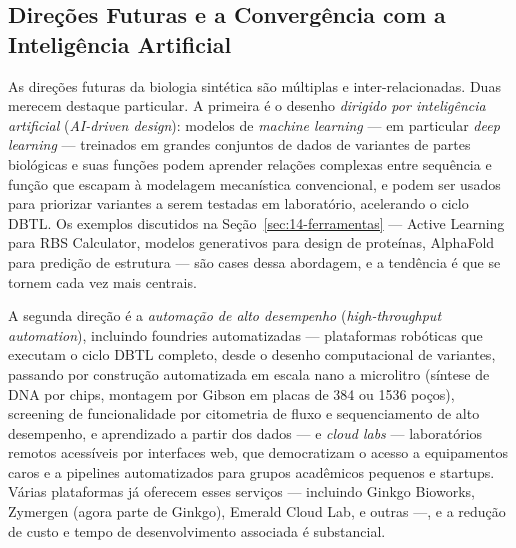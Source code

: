 
\subsection{Direções Futuras e a Convergência com a Inteligência Artificial}

As direções futuras da biologia sintética são múltiplas e inter-relacionadas. Duas merecem destaque particular. A primeira é o desenho \emph{dirigido por inteligência artificial} (\emph{AI-driven design}): modelos de \emph{machine learning} --- em particular \emph{deep learning} --- treinados em grandes conjuntos de dados de variantes de partes biológicas e suas funções podem aprender relações complexas entre sequência e função que escapam à modelagem mecanística convencional, e podem ser usados para priorizar variantes a serem testadas em laboratório, acelerando o ciclo DBTL. Os exemplos discutidos na Seção~\ref{sec:14-ferramentas} --- Active Learning para RBS Calculator, modelos generativos para design de proteínas, AlphaFold para predição de estrutura --- são cases dessa abordagem, e a tendência é que se tornem cada vez mais centrais.

A segunda direção é a \emph{automação de alto desempenho} (\emph{high-throughput automation}), incluindo foundries automatizadas --- plataformas robóticas que executam o ciclo DBTL completo, desde o desenho computacional de variantes, passando por construção automatizada em escala nano a microlitro (síntese de DNA por chips, montagem por Gibson em placas de 384 ou 1536 poços), screening de funcionalidade por citometria de fluxo e sequenciamento de alto desempenho, e aprendizado a partir dos dados --- e \emph{cloud labs} --- laboratórios remotos acessíveis por interfaces web, que democratizam o acesso a equipamentos caros e a pipelines automatizados para grupos acadêmicos pequenos e startups. Várias plataformas já oferecem esses serviços --- incluindo Ginkgo Bioworks, Zymergen (agora parte de Ginkgo), Emerald Cloud Lab, e outras ---, e a redução de custo e tempo de desenvolvimento associada é substancial.

